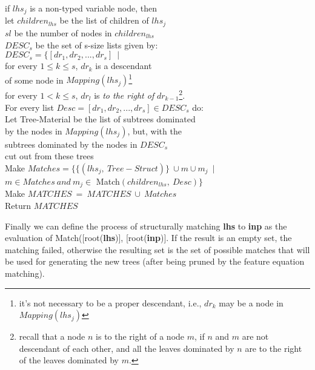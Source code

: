 \begin{tabbing}
\>\>\>\> if $lhs_j$ is a non-typed variable node, then \\

\>\>\>\>\> let \>$children_{lhs}$ be the list of children of $lhs_j$ \\
\>\>\>\>\> \> $sl$ be the number of nodes in $children_{lhs}$ \\

\>\>\>\>\>\> $DESC_s$ be the set of s-size lists given by: \\
\>\>\>\>\>\>\>\> $DESC_s=\{[dr_1,dr_2,...,dr_s]\ \mid\ $ \\
\>\>\>\>\>\>\>\>\>\> for every $1 \leq k \leq s$, $dr_k$ is a descendant \\
\>\>\>\>\>\>\>\>\>\>\>\> of
                        some node in $Mapping(lhs_j)$\footnote{it's not 
                necessary to be a proper descendant,
                i.e., $dr_k$ may be a node in $Mapping(lhs_j)$}\\
\>\>\>\>\>\>\>\>\>\> for every $1 < k \leq s$, $dr_l$ is {\it to the right of}
                        $dr_{k-1}$\footnote{recall that a node 
$n$ is to the right of a node $m$, if $n$ and $m$ are not descendant of each
other, and all the leaves dominated by $n$ are to the right of the leaves
dominated by $m$.}.\\

\>\>\>\>\>\> For every list $Desc=[dr_1,dr_2,...,dr_s] \in DESC_s$ do: \\

\>\>\>\>\>\>\> Let Tree-Material be the list of subtrees dominated \\
\>\>\>\>\>\>\>\>\> by the nodes in $Mapping(lhs_j)$, but, with the \\
\>\>\>\>\>\>\>\>\> subtrees dominated by the nodes in $DESC_s$ \\
\>\>\>\>\>\>\>\>\> cut out from these trees \\

\>\>\>\>\>\>\> Make $Matches=\{\{(lhs_j,\ Tree-Struct)\}\ \cup 
        m\cup m_j\ \mid$ \\
\>\>\>\>\>\>\>\>\> $m\in Matches\ and\ 
        m_j\in$ Match$(children_{lhs},\ Desc)\}$ \\ 

\>\>\> Make $MATCHES\ =\ MATCHES\ \cup\ Matches$ \\

\>\> Return $MATCHES$

\end{tabbing}

Finally we can define the process of structurally matching {\bf lhs} to
{\bf inp} as the evaluation of Match([root({\bf lhs})], [root({\bf inp})].
If the result is an empty set, the matching failed, otherwise the resulting
set is the set of possible matches that will be used for generating the
new trees (after being pruned by the feature equation matching).

